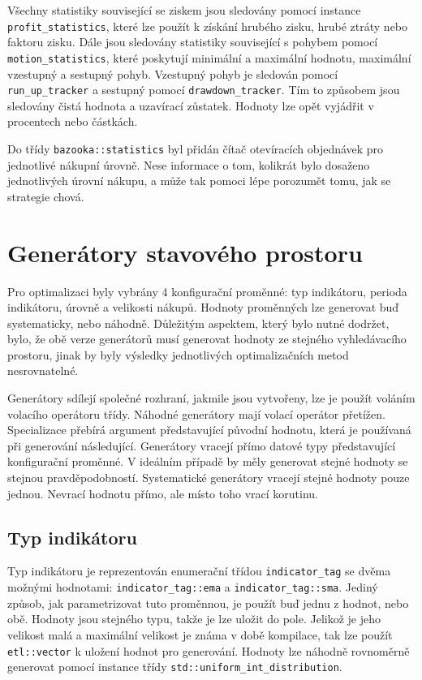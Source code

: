 Všechny statistiky související se ziskem jsou sledovány pomocí instance \texttt{profit\_statistics}, které lze použít k získání hrubého zisku, hrubé ztráty nebo faktoru zisku.
Dále jsou sledovány statistiky související s pohybem pomocí \texttt{motion\_statistics}, které poskytují minimální a maximální hodnotu, maximální vzestupný a sestupný pohyb.
Vzestupný pohyb je sledován pomocí \texttt{run\_up\_tracker} a sestupný pomocí \texttt{drawdown\_tracker}.
Tím to způsobem jsou sledovány čistá hodnota a uzavírací zůstatek.
Hodnoty lze opět vyjádřit v procentech nebo částkách.

Do třídy \texttt{bazooka::statistics} byl přidán čítač otevíracích objednávek pro jednotlivé nákupní úrovně.
Nese informace o tom, kolikrát bylo dosaženo jednotlivých úrovní nákupu, a může tak pomoci lépe porozumět tomu, jak se strategie chová.

\chapter{Generátory stavového prostoru}

Pro optimalizaci byly vybrány 4 konfigurační proměnné: typ indikátoru, perioda indikátoru, úrovně a velikosti nákupů.
Hodnoty proměnných lze generovat buď systematicky, nebo náhodně.
Důležitým aspektem, který bylo nutné dodržet, bylo, že obě verze generátorů musí generovat hodnoty ze stejného vyhledávacího prostoru, jinak by byly výsledky jednotlivých optimalizačních metod nesrovnatelné.

Generátory sdílejí společné rozhraní, jakmile jsou vytvořeny, lze je použít voláním volacího operátoru třídy.
Náhodné generátory mají volací operátor přetížen.
Specializace přebírá argument představující původní hodnotu, která je používaná při generování následující.
Generátory vracejí přímo datové typy představující konfigurační proměnné.
V ideálním případě by měly generovat stejné hodnoty se stejnou pravděpodobností.
Systematické generátory vracejí stejné hodnoty pouze jednou.
Nevrací hodnotu přímo, ale místo toho vrací korutinu.

\section{Typ indikátoru}
Typ indikátoru je reprezentován enumerační třídou \texttt{indicator\_tag} se dvěma možnými hodnotami: \texttt{indicator\_tag::ema} a \texttt{indicator\_tag::sma}.
Jediný způsob, jak parametrizovat tuto proměnnou, je použít buď jednu z hodnot, nebo obě.
Hodnoty jsou stejného typu, takže je lze uložit do pole.
Jelikož je jeho velikost malá a maximální velikost je známa v době kompilace, tak lze použít \texttt{etl::vector} k uložení hodnot pro generování.
Hodnoty lze náhodně rovnoměrně generovat pomocí instance třídy \texttt{std::uniform\_int\_distribution}.

